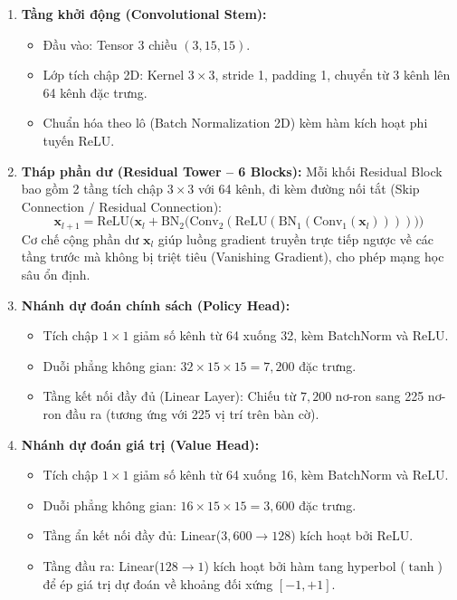 \documentclass[11pt,a4paper]{report}
\begin{document}
\begin{enumerate}
    \item \textbf{Tầng khởi động (Convolutional Stem):}
    \begin{itemize}
        \item Đầu vào: Tensor 3 chiều $(3, 15, 15)$.
        \item Lớp tích chập 2D: Kernel $3 \times 3$, stride 1, padding 1, chuyển từ 3 kênh lên 64 kênh đặc trưng.
        \item Chuẩn hóa theo lô (Batch Normalization 2D) kèm hàm kích hoạt phi tuyến ReLU.
    \end{itemize}
    \item \textbf{Tháp phần dư (Residual Tower -- 6 Blocks):}
    Mỗi khối Residual Block bao gồm 2 tầng tích chập $3 \times 3$ với 64 kênh, đi kèm đường nối tắt (Skip Connection / Residual Connection):
    \begin{equation}
        \mathbf{x}_{l+1} = \text{ReLU}\Big(\mathbf{x}_l + \text{BN}_2\big(\text{Conv}_2(\text{ReLU}(\text{BN}_1(\text{Conv}_1(\mathbf{x}_l))))\big)\Big)
    \end{equation}
    Cơ chế cộng phần dư $\mathbf{x}_l$ giúp luồng gradient truyền trực tiếp ngược về các tầng trước mà không bị triệt tiêu (Vanishing Gradient), cho phép mạng học sâu ổn định.
    \item \textbf{Nhánh dự đoán chính sách (Policy Head):}
    \begin{itemize}
        \item Tích chập $1 \times 1$ giảm số kênh từ 64 xuống 32, kèm BatchNorm và ReLU.
        \item Duỗi phẳng không gian: $32 \times 15 \times 15 = 7{,}200$ đặc trưng.
        \item Tầng kết nối đầy đủ (Linear Layer): Chiếu từ $7{,}200$ nơ-ron sang 225 nơ-ron đầu ra (tương ứng với 225 vị trí trên bàn cờ).
    \end{itemize}
    \item \textbf{Nhánh dự đoán giá trị (Value Head):}
    \begin{itemize}
        \item Tích chập $1 \times 1$ giảm số kênh từ 64 xuống 16, kèm BatchNorm và ReLU.
        \item Duỗi phẳng không gian: $16 \times 15 \times 15 = 3{,}600$ đặc trưng.
        \item Tầng ẩn kết nối đầy đủ: Linear($3{,}600 \to 128$) kích hoạt bởi ReLU.
        \item Tầng đầu ra: Linear($128 \to 1$) kích hoạt bởi hàm tang hyperbol ($\tanh$) để ép giá trị dự đoán về khoảng đối xứng $[-1, +1]$.
    \end{itemize}
\end{enumerate}
\end{document}

